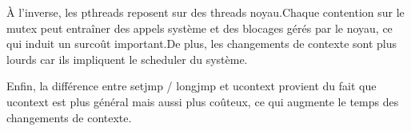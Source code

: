 \noindent À l’inverse,
      les pthreads reposent sur des threads noyau.Chaque contention sur le mutex
          peut entraîner des appels système et des blocages gérés par le noyau,
      ce qui induit un surcoût important.De plus,
      les changements de contexte sont plus lourds car ils impliquent le
          scheduler du système.\

      Enfin,
      la différence entre setjmp /
          longjmp et ucontext provient du fait que ucontext est plus général
              mais aussi plus coûteux,
      ce qui augmente le temps des changements de contexte.
